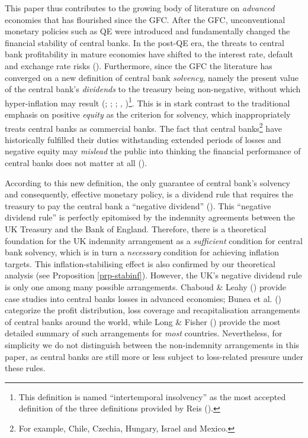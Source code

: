 \documentclass[
  a4paper,
  abstract=true]{scrartcl}
\theoremstyle{definition}
\begin{document}
This paper thus contributes to the growing body of literature on
\emph{advanced} economies that has flourished since the GFC. After the
GFC, unconventional monetary policies such as QE were introduced and
fundamentally changed the financial stability of central banks. In the
post-QE era, the threats to central bank profitability in mature
economies have shifted to the interest rate, default and exchange rate
risks (). Furthermore, since
the GFC the literature has converged on a new definition of central bank
\emph{solvency}, namely the present value of the central bank's
\emph{dividends} to the treasury being non-negative, without which
hyper-inflation may result (; ;
;
,
)\footnote{This definition is named
  ``intertemporal insolvency'' as the most accepted definition of the
  three definitions provided by Reis ().}.
This is in stark contrast to the traditional emphasis on positive
\emph{equity} as the criterion for solvency, which inappropriately
treats central banks as commercial banks. The fact that central
banks\footnote{For example, Chile, Czechia, Hungary, Israel and Mexico.}
have historically fulfilled their duties withstanding extended periods
of losses and negative equity may \emph{mislead} the public into
thinking the financial performance of central banks does not matter at
all ().

According to this new definition, the only guarantee of central bank's
solvency and consequently, effective monetary policy, is a dividend rule
that requires the treasury to pay the central bank a ``negative
dividend'' (). This
``negative dividend rule'' is perfectly epitomised by the indemnity
agreements between the UK Treasury and the Bank of England. Therefore,
there is a theoretical foundation for the UK indemnity arrangement as a
\emph{sufficient} condition for central bank solvency, which is in turn
a \emph{necessary} condition for achieving inflation targets. This
inflation-stabilising effect is also confirmed by our theoretical
analysis (see Proposition \ref{prp-stabinf}). However, the UK's negative
dividend rule is only one among many possible arrangements. Chaboud \&
Leahy () provide case studies into
central banks losses in advanced economies; Bunea et al.
() categorize the profit distribution,
loss coverage and recapitalisation arrangements of central banks around
the world, while Long \& Fisher () provide
the most detailed summary of such arrangements for \emph{most}
countries. Nevertheless, for simplicity we do not distinguish between
the non-indemnity arrangements in this paper, as central banks are still
more or less subject to loss-related pressure under these rules.
\end{document}
